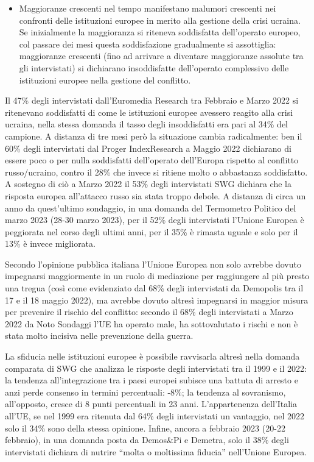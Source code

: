 \documentclass[
]{book}
\providecommand{\tightlist}{%
  \setlength{\itemsep}{0pt}\setlength{\parskip}{0pt}}
\begin{document}
\begin{itemize}
\tightlist
\item
  Maggioranze crescenti nel tempo manifestano malumori crescenti nei confronti delle istituzioni europee in merito alla gestione della crisi ucraina. Se inizialmente la maggioranza si riteneva soddisfatta dell'operato europeo, col passare dei mesi questa soddisfazione gradualmente si assottiglia: maggioranze crescenti (fino ad arrivare a diventare maggioranze assolute tra gli intervistati) si dichiarano insoddisfatte dell'operato complessivo delle istituzioni europee nella gestione del conflitto.
\end{itemize}

Il 47\% degli intervistati dall'Euromedia Research tra Febbraio e Marzo 2022 si ritenevano soddisfatti di come le istituzioni europee avessero reagito alla crisi ucraina, nella stessa domanda il tasso degli insoddisfatti era pari al 34\% del campione. A distanza di tre mesi però la situazione cambia radicalmente: ben il 60\% degli intervistati dal Proger IndexResearch a Maggio 2022 dichiarano di essere poco o per nulla soddisfatti dell'operato dell'Europa rispetto al conflitto russo/ucraino, contro il 28\% che invece si ritiene molto o abbastanza soddisfatto. A sostegno di ciò a Marzo 2022 il 53\% degli intervistati SWG dichiara che la risposta europea all'attacco russo sia stata troppo debole.
A distanza di circa un anno da quest'ultimo sondaggio, in una domanda del Termometro Politico del marzo 2023 (28-30 marzo 2023), per il 52\% degli intervistati l'Unione Europea è peggiorata nel corso degli ultimi anni, per il 35\% è rimasta uguale e solo per il 13\% è invece migliorata.

Secondo l'opinione pubblica italiana l'Unione Europea non solo avrebbe dovuto impegnarsi maggiormente in un ruolo di mediazione per raggiungere al più presto una tregua (così come evidenziato dal 68\% degli intervistati da Demopolis tra il 17 e il 18 maggio 2022), ma avrebbe dovuto altresì impegnarsi in maggior misura per prevenire il rischio del conflitto: secondo il 68\% degli intervistati a Marzo 2022 da Noto Sondaggi l'UE ha operato male, ha sottovalutato i rischi e non è stata molto incisiva nelle prevenzione della guerra.

La sfiducia nelle istituzioni europee è possibile ravvisarla altresì nella domanda comparata di SWG che analizza le risposte degli intervistati tra il 1999 e il 2022: la tendenza all'integrazione tra i paesi europei subisce una battuta di arresto e anzi perde consenso in termini percentuali: -8\%; la tendenza al sovranismo, all'opposto, cresce di 8 punti percentuali in 23 anni. L'appartenenza dell'Italia all'UE, se nel 1999 era ritenuta dal 64\% degli intervistati un vantaggio, nel 2022 solo il 34\% sono della stessa opinione. Infine, ancora a febbraio 2023 (20-22 febbraio), in una domanda posta da Demos\&Pi e Demetra, solo il 38\% degli intervistati dichiara di nutrire ``molta o moltissima fiducia'' nell'Unione Europea.
\end{document}
